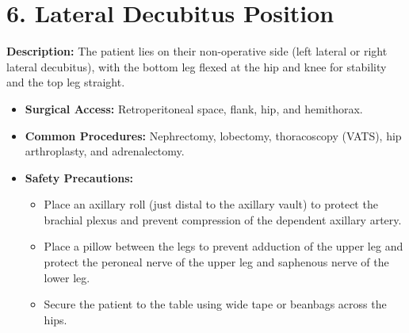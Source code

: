\section*{6. Lateral Decubitus Position}
\textbf{Description:} The patient lies on their non-operative side (left lateral or right lateral decubitus), with the bottom leg flexed at the hip and knee for stability and the top leg straight.
\begin{itemize}
  \item \textbf{Surgical Access:} Retroperitoneal space, flank, hip, and hemithorax.
  \item \textbf{Common Procedures:} Nephrectomy, lobectomy, thoracoscopy (VATS), hip arthroplasty, and adrenalectomy.
  \item \textbf{Safety Precautions:}
  \begin{itemize}
    \item Place an axillary roll (just distal to the axillary vault) to protect the brachial plexus and prevent compression of the dependent axillary artery.
    \item Place a pillow between the legs to prevent adduction of the upper leg and protect the peroneal nerve of the upper leg and saphenous nerve of the lower leg.
    \item Secure the patient to the table using wide tape or beanbags across the hips.
  \end{itemize}
\end{itemize}

\clearpage

